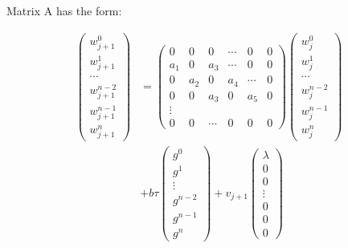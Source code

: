 \documentclass{ifacconf}
\begin{document}
Matrix A has the form:

\begin{align}
 \begin{pmatrix} w^0_{j+1} \\ w^1_{j+1} \\ \cdots \\ w^{n-2}_{j+1} \\ w^{n-1}_{j+1} \\ w^{n}_{j+1}  \end{pmatrix} &= \left( \begin{matrix}
0 & 0 & 0 & \cdots & 0 & 0 \\
a_{1} & 0 & a_{3} & \cdots & 0 & 0\\
0 & a_{2} & 0 & a_{4} & \cdots & 0\\
0 & 0 & a_{3} & 0 & a_5 & 0\\
\vdots \\
0 & 0 & \cdots &  0 & 0 & 0  \end{matrix} \right) \begin{pmatrix} w^0_j \\ w^1_j \\ \cdots \\ w^{n-2}_j \\ w^{n-1}_j \\ w^{n}_j\end{pmatrix}  \\
&+ b\tau \begin{pmatrix} g^0 \\ g^1 \\ \vdots \\ g^{n-2} \\ g^{n-1} \\ g^{n} \end{pmatrix} + v_{j+1} \begin{pmatrix}
\lambda \\ 0  \\ 0  \\ \vdots \\ 0 \\ 0 \\ 0
\end{pmatrix}
\end{align}
\end{document}
